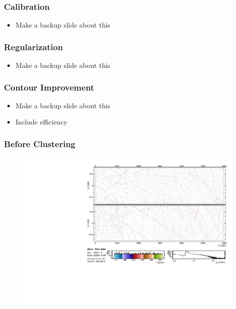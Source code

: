 \documentclass[10pt,professionalfonts,xcolor=table]{beamer}
\begin{document}
\begin{frame}
\frametitle{Calibration}

\begin{itemize}
\item Make a backup slide about this
\end{itemize}
\end{frame}


\begin{frame}
\frametitle{Regularization}

\begin{itemize}
\item Make a backup slide about this
\end{itemize}
\end{frame}


\begin{frame}
\frametitle{Contour Improvement}

\begin{itemize}
\item Make a backup slide about this
\item Include efficiency
\end{itemize}
\end{frame}


\frame
{
  \frametitle{Before Clustering}

 \begin{figure} \includegraphics[height=0.9\textwidth, angle=-90]{figures/evd_steps/evd_hits.pdf} \end{figure}
}
\end{document}

